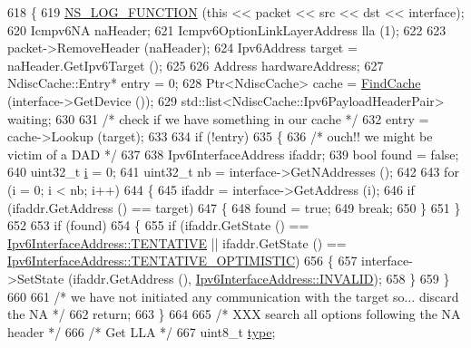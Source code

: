 \begin{DoxyCode}
618 \{
619   \hyperlink{log-macros-disabled_8h_a90b90d5bad1f39cb1b64923ea94c0761}{NS\_LOG\_FUNCTION} (\textcolor{keyword}{this} << packet << src << dst << interface);
620   Icmpv6NA naHeader;
621   Icmpv6OptionLinkLayerAddress lla (1);
622 
623   packet->RemoveHeader (naHeader);
624   Ipv6Address target = naHeader.GetIpv6Target ();
625 
626   Address hardwareAddress;
627   NdiscCache::Entry* entry = 0;
628   Ptr<NdiscCache> cache = \hyperlink{classns3_1_1Icmpv6L4Protocol_a90167126423f3957718e22a8bcd325c8}{FindCache} (interface->GetDevice ());
629   std::list<NdiscCache::Ipv6PayloadHeaderPair> waiting;
630 
631   \textcolor{comment}{/* check if we have something in our cache */}
632   entry = cache->Lookup (target);
633 
634   \textcolor{keywordflow}{if} (!entry)
635     \{
636       \textcolor{comment}{/* ouch!! we might be victim of a DAD */}
637       
638       Ipv6InterfaceAddress ifaddr;
639       \textcolor{keywordtype}{bool} found = \textcolor{keyword}{false};
640       uint32\_t \hyperlink{bernuolliDistribution_8m_a6f6ccfcf58b31cb6412107d9d5281426}{i} = 0;
641       uint32\_t nb = interface->GetNAddresses ();
642 
643       \textcolor{keywordflow}{for} (i = 0; i < nb; i++)
644         \{
645           ifaddr = interface->GetAddress (i);
646           \textcolor{keywordflow}{if} (ifaddr.GetAddress () == target)
647             \{
648               found = \textcolor{keyword}{true};
649               \textcolor{keywordflow}{break};
650             \}
651         \}
652 
653       \textcolor{keywordflow}{if} (found)
654         \{
655           \textcolor{keywordflow}{if} (ifaddr.GetState () == \hyperlink{classns3_1_1Ipv6InterfaceAddress_aa01e95b0e78bf3f0200a98f6bfe64f07ab063514dcc5adedfd56f1ad77fec415c}{Ipv6InterfaceAddress::TENTATIVE} || 
      ifaddr.GetState () == \hyperlink{classns3_1_1Ipv6InterfaceAddress_aa01e95b0e78bf3f0200a98f6bfe64f07a53eead20cfcd55f67318da206a7a109f}{Ipv6InterfaceAddress::TENTATIVE\_OPTIMISTIC})
656             \{
657               interface->SetState (ifaddr.GetAddress (), 
      \hyperlink{classns3_1_1Ipv6InterfaceAddress_aa01e95b0e78bf3f0200a98f6bfe64f07a5b475f38730e5a2cd323cc530163e47c}{Ipv6InterfaceAddress::INVALID});
658             \}
659         \}
660 
661       \textcolor{comment}{/* we have not initiated any communication with the target so... discard the NA */}
662       \textcolor{keywordflow}{return};
663     \}
664 
665   \textcolor{comment}{/* XXX search all options following the NA header */}
666   \textcolor{comment}{/* Get LLA */}
667   uint8\_t \hyperlink{visualizer-ideas_8txt_add98db9e15e2a58cf2b57623e7aa893a}{type};

\end{DoxyCode}
